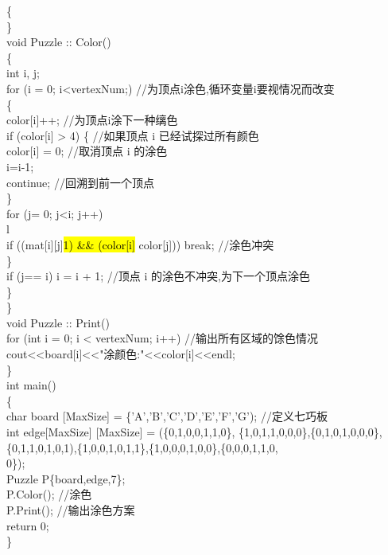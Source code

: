\documentclass[10pt]{article}
\begin{document}
\begin{verbatim}

\end{verbatim}

\{\\
\}\\
void Puzzle :: Color()\\
\{\\
int i, j;\\
for (i = 0; i<vertexNum;) //为顶点i涂色,循环变量i要视情况而改变\\
\{\\[0pt]
color[i]++; //为顶点i涂下一种缡色\\[0pt]
if (color[i] > 4) \{ //如果顶点 i 已经试探过所有颜色\\[0pt]
color[i] = 0; //取消顶点 i 的涂色\\
i=i-1;\\
continue; //回溯到前一个顶点\\
\}\\
for (j= 0; j<i; j++)\\
l\\[0pt]
if ((mat[i][j]\hl{1) \&\& (color[i]} color[j])) break; //涂色冲突\\
\}\\
if (j== i) i = i + 1; //顶点 i 的涂色不冲突,为下一个顶点涂色\\
\}\\
\}\\
void Puzzle :: Print()\\
for (int i = 0; i < vertexNum; i++) //输出所有区域的馀色情况\\[0pt]
cout<<board[i]<<"涂颜色:"<<color[i]<<endl;\\
\}\\
int main()\\
\{\\[0pt]
char board [MaxSize] = \{'A','B','C','D','E','F','G'); //定义七巧板\\[0pt]
int edge[MaxSize] [MaxSize] = (\{0,1,0,0,1,1,0\}, \{1,0,1,1,0,0,0\},\{0,1,0,1,0,0,0\},\\
\{0,1,1,0,1,0,1),\{1,0,0,1,0,1,1\},\{1,0,0,0,1,0,0\},\{0,0,0,1,1,0,\\
0\});\\
Puzzle P\{board,edge,7\};\\
P.Color(); //涂色\\
P.Print(); //输出涂色方案\\
return 0;\\
\}
\end{document}
